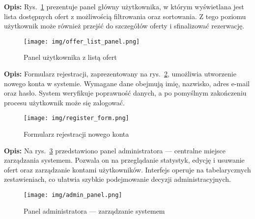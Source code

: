\noindent
{\small \textbf{Opis:} Rys.~\ref{fig:offer_panel} prezentuje panel główny użytkownika, w którym wyświetlana jest lista dostępnych ofert z możliwością filtrowania oraz sortowania. Z tego poziomu użytkownik może również przejść do szczegółów oferty i sfinalizować rezerwację.}
\begin{figure}[H]
    \centering
    \texttt{[image: img/offer\_list\_panel.png]}
    \caption{Panel użytkownika z listą ofert}
    \label{fig:offer_panel}
\end{figure}

\noindent
{\small \textbf{Opis:} Formularz rejestracji, zaprezentowany na rys.~\ref{fig:register_form}, umożliwia utworzenie nowego konta w systemie. Wymagane dane obejmują imię, nazwisko, adres e-mail oraz hasło. System weryfikuje poprawność danych, a po pomyślnym zakończeniu procesu użytkownik może się zalogować.}
\begin{figure}[H]
    \centering
    \texttt{[image: img/register\_form.png]}
    \caption{Formularz rejestracji nowego konta}
    \label{fig:register_form}
\end{figure}

\noindent
{\small \textbf{Opis:} Na rys.~\ref{fig:admin_panel} przedstawiono panel administratora — centralne miejsce zarządzania systemem. Pozwala on na przeglądanie statystyk, edycję i usuwanie ofert oraz zarządzanie kontami użytkowników. Interfejs operuje na tabelarycznych zestawieniach, co ułatwia szybkie podejmowanie decyzji administracyjnych.}
\begin{figure}[H]
    \centering
    \texttt{[image: img/admin\_panel.png]}
    \caption{Panel administratora — zarządzanie systemem}
    \label{fig:admin_panel}
\end{figure}
